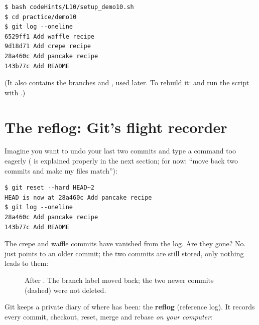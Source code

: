 \begin{lstlisting}
$ bash codeHints/L10/setup_demo10.sh
$ cd practice/demo10
$ git log --oneline
6529ff1 Add waffle recipe
9d18d71 Add crepe recipe
28a460c Add pancake recipe
143b77c Add README
\end{lstlisting}

(It also contains the branches  and , used later. To rebuild it:  and run the script with .)

\section{The reflog: Git's flight recorder}

Imagine you want to undo your last two commits and type a command too eagerly ( is explained properly in the next section; for now: ``move  back two commits and make my files match''):

\begin{lstlisting}
$ git reset --hard HEAD~2
HEAD is now at 28a460c Add pancake recipe
$ git log --oneline
28a460c Add pancake recipe
143b77c Add README
\end{lstlisting}

The crepe and waffle commits have vanished from the log. Are they gone? No.  just points to an older commit; the two commits are still stored, only nothing leads to them:

\begin{figure}[H]
\centering
{}
\caption{After . The branch label moved back; the two newer commits (dashed) were not deleted.}
\label{fig:lost}
\end{figure}

Git keeps a private diary of where  has been: the \textbf{reflog} (reference log). It records every commit, checkout, reset, merge and rebase \emph{on your computer}:

